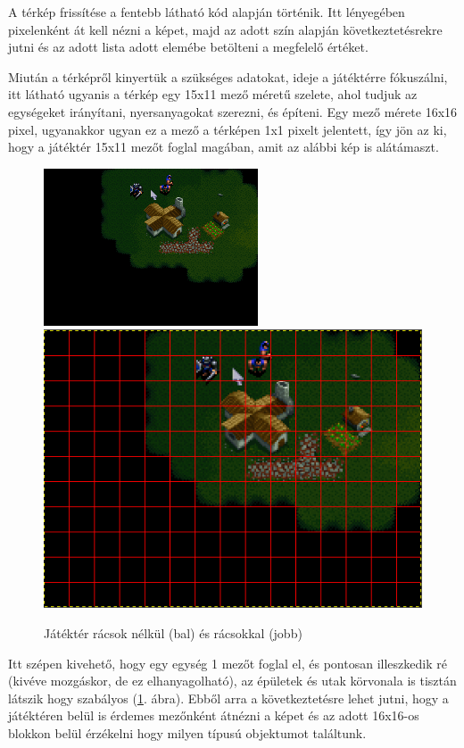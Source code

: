 A térkép frissítése a fentebb látható kód alapján történik. Itt lényegében pixelenként át kell nézni a képet, majd az adott szín alapján következtetésrekre jutni és az adott lista adott elemébe betölteni a megfelelő értéket.

Miután a térképről kinyertük a szükséges adatokat, ideje a játéktérre fókuszálni, itt látható ugyanis a térkép egy 15x11 mező méretű szelete, ahol tudjuk az egységeket irányítani, nyersanyagokat szerezni, és építeni.
Egy mező mérete 16x16 pixel, ugyanakkor ugyan ez a mező a térképen 1x1 pixelt jelentett, így jön az ki, hogy a játéktér 15x11 mezőt foglal magában, amit az alábbi kép is alátámaszt.
\begin{figure}[h]
    \centering
    \includegraphics[scale=0.8]{images/playArea.png}
    \includegraphics[scale=0.53]{images/playAreaRed.png}
    \caption{Játéktér rácsok nélkül (bal) és rácsokkal (jobb)}
    \label{fig:playArea}
\end{figure}

Itt szépen kivehető, hogy egy egység 1 mezőt foglal el, és pontosan illeszkedik ré (kivéve mozgáskor, de ez elhanyagolható), az épületek és utak körvonala is tisztán látszik hogy szabályos (\ref{fig:playArea}. ábra).
Ebből arra a következtetésre lehet jutni, hogy a játéktéren belül is érdemes mezőnként átnézni a képet és az adott 16x16-os blokkon belül érzékelni hogy milyen típusú objektumot találtunk.

